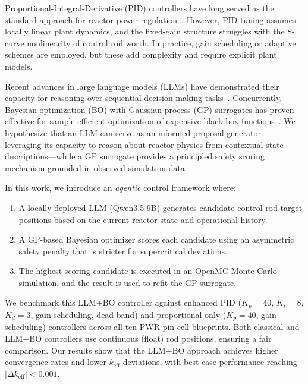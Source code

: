 \documentclass[11pt,twocolumn]{article}
\begin{document}
Proportional-Integral-Derivative (PID) controllers have long served as the standard approach for reactor power regulation~\cite{cho2012nuclear}.
However, PID tuning assumes locally linear plant dynamics, and the fixed-gain structure struggles with the S-curve nonlinearity of control rod worth.
In practice, gain scheduling or adaptive schemes are employed, but these add complexity and require explicit plant models.

Recent advances in large language models (LLMs) have demonstrated their capacity for reasoning over sequential decision-making tasks~\cite{brown2020language,touvron2023llama}.
Concurrently, Bayesian optimization (BO) with Gaussian process (GP) surrogates has proven effective for sample-efficient optimization of expensive black-box functions~\cite{shahriari2016taking,snoek2012practical}.
We hypothesize that an LLM can serve as an informed proposal generator---leveraging its capacity to reason about reactor physics from contextual state descriptions---while a GP surrogate provides a principled safety scoring mechanism grounded in observed simulation data.

In this work, we introduce an \emph{agentic} control framework where:
\begin{enumerate}
    \item A locally deployed LLM (Qwen3.5-9B) generates candidate control rod target positions based on the current reactor state and operational history.
    \item A GP-based Bayesian optimizer scores each candidate using an asymmetric safety penalty that is stricter for supercritical deviations.
    \item The highest-scoring candidate is executed in an OpenMC Monte Carlo simulation, and the result is used to refit the GP surrogate.
\end{enumerate}

We benchmark this LLM+BO controller against enhanced PID ($K_p\!=\!40$, $K_i\!=\!8$, $K_d\!=\!3$, gain scheduling, dead-band) and proportional-only ($K_p\!=\!40$, gain scheduling) controllers across all ten PWR pin-cell blueprints.
Both classical and LLM+BO controllers use continuous (float) rod positions, ensuring a fair comparison.
Our results show that the LLM+BO approach achieves higher convergence rates and lower $k_\text{eff}$ deviations, with best-case performance reaching $|\Delta k_\text{eff}| < 0.001$.

\end{document}
